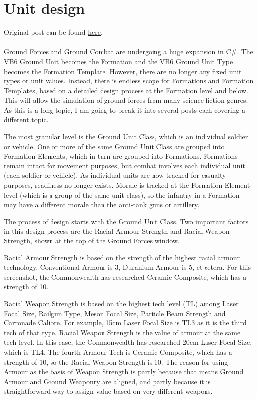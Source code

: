 \documentclass[../Aurora C# unofficial manual.tex]{subfiles}
\begin{document}
	\section{Unit design}
	Original post can be found
	\href{http://aurora2.pentarch.org/index.php?topic=8495.msg105824#msg105824}{here}.
	\\\\
	
	Ground Forces and Ground Combat are undergoing a huge expansion in C\#. The VB6 Ground Unit becomes the Formation and the VB6 Ground Unit Type becomes the Formation Template. However, there are no longer any fixed unit types or unit values. Instead, there is endless scope for Formations and Formation Templates, based on a detailed design process at the Formation level and below. This will allow the simulation of ground forces from many science fiction genres. As this is a long topic, I am going to break it into several posts each covering a different topic.
	
	The most granular level is the Ground Unit Class, which is an individual soldier or vehicle. One or more of the same Ground Unit Class are grouped into Formation Elements, which in turn are grouped into Formations. Formations remain intact for movement purposes, but combat involves each individual unit (each soldier or vehicle). As individual units are now tracked for casualty purposes, readiness no longer exists. Morale is tracked at the Formation Element level (which is a group of the same unit class), so the infantry in a Formation may have a different morale than the anti-tank guns or artillery.
	
	The process of design starts with the Ground Unit Class. Two important factors in this design process are the Racial Armour Strength and Racial Weapon Strength, shown at the top of the Ground Forces window.
	
	Racial Armour Strength is based on the strength of the highest racial armour technology. Conventional Armour is 3, Duranium Armour is 5, et cetera. For this screenshot, the Commonwealth has researched Ceramic Composite, which has a strength of 10.
	
	Racial Weapon Strength is based on the highest tech level (TL) among Laser Focal Size, Railgun Type, Meson Focal Size, Particle Beam Strength and Carronade Calibre. For example, 15cm Laser Focal Size is TL3 as it is the third tech of that type. Racial Weapon Strength is the value of armour at the same tech level. In this case, the Commonwealth has researched 20cm Laser Focal Size, which is TL4. The fourth Armour Tech is Ceramic Composite, which has a strength of 10, so the Racial Weapon Strength is 10. The reason for using Armour as the basis of Weapon Strength is partly because that means Ground Armour and Ground Weaponry are aligned, and partly because it is straightforward way to assign value based on very different weapons.
	
\end{document}
